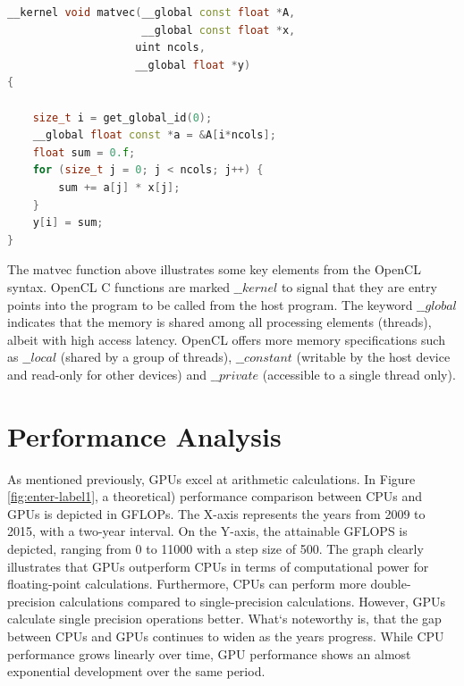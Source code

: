 \documentclass[conference]{IEEEtran}
\begin{document}
\begin{lstlisting}[language=C++, basicstyle=\ttfamily\small\lst@ifdisplaystyle\fontsize{8.9}{10.5}\fi
, caption=The function above calculates the dot product of a single row of a matrix A and a vector x:  \texttt{y_i = a_{i,:} \cdot x = \(\sum_{j} a_{i,j} x_{j}\)}
\cite{b4}
,captionpos=b]
__kernel void matvec(__global const float *A,
                     __global const float *x,
                    uint ncols,
                    __global float *y)
{

    size_t i = get_global_id(0);            
    __global float const *a = &A[i*ncols];    
    float sum = 0.f;                          
    for (size_t j = 0; j < ncols; j++) {
        sum += a[j] * x[j];
    }
    y[i] = sum;
}
\end{lstlisting}

The matvec function above illustrates some key elements from the OpenCL syntax. OpenCL C functions are marked $ \_\_kernel $ to signal that they are entry points into the program to be called from the host program. The keyword $ \_\_global $ indicates that the memory is shared among all processing elements (threads), albeit with high access latency. OpenCL offers more memory specifications such as $ \_\_local $ (shared by a group of threads), $ \_\_constant $ (writable by the host device and read-only for other devices) and $ \_\_private $ (accessible to a single thread only).\cite{b4}


\section{Performance Analysis}
As mentioned previously, GPUs excel at arithmetic calculations. In Figure
 \ref{fig:enter-label1},  a theoretical) performance comparison between CPUs and GPUs is depicted in GFLOPs. The X-axis represents the years from 2009 to 2015, with a two-year interval. On the Y-axis, the attainable GFLOPS is depicted, ranging from 0 to 11000 with a step size of 500. 
  The graph clearly illustrates that GPUs outperform CPUs in terms of computational power for floating-point calculations. Furthermore, CPUs can perform more double-precision calculations compared to single-precision calculations. However, GPUs calculate single precision operations better. What`s noteworthy is, that the gap between CPUs and GPUs continues to widen as the years progress. While CPU performance 
 grows linearly over time, GPU performance shows an almost exponential development over the same period. 
\end{document}
